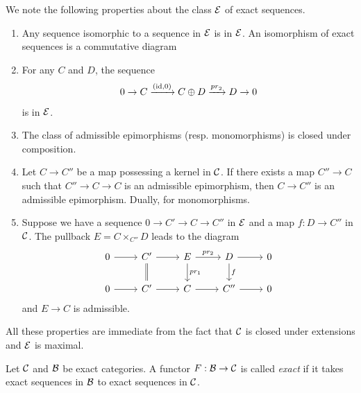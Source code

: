 \begin{proposition}
We note the following properties about the class $\mathcal{E}$ of exact sequences.
\begin{enumerate}
  \item Any sequence isomorphic to a sequence in $\mathcal{E}$ is in $\mathcal{E}$. An isomorphism of exact sequences is a commutative diagram
  \item For any $C$ and $D$, the sequence
  \[
  0 \to {C} \xrightarrow{(\operatorname*{id},0)} {C\oplus D} \xrightarrow{\mathord{pr}_2} {D} \to 0
  \]
  is in $\mathcal{E}$.
  \item The class of admissible epimorphisms (resp. monomorphisms) is closed under composition.
  \item Let $C \to C''$ be a map possessing a kernel in $\mathcal{C}$. If there exists a map $C'' \to C$
  such that $C'' \to C \to C$ is an admissible epimorphism, then $C \to C''$ is an admissible epimorphism.
  Dually, for monomorphisms.
  \item Suppose we have a sequence $0 \to C' \to C \to C''$ in $\mathcal{E}$ and a map $f : D \to C''$ in $\mathcal{C}$.
  The pullback $E = C \times_{C''} D$ leads to the diagram 
  \[
  \begin{tikzcd}
  0 \arrow[r] &   C' \arrow[r] \arrow[d, equal] &   E \arrow[r,  "\mathord{pr_2}"] \arrow[d, "\mathord{pr_1}"] &   D \arrow[r] \arrow[d, "f"] &   0  \\
  0 \arrow[r] &   C' \arrow[r]                &   C \arrow[r]                &   C'' \arrow[r]                &   0 
  \end{tikzcd}
  \] 
  and $E \to C$ is admissible. 
\end{enumerate}
\end{proposition}

All these properties are immediate from the fact that $\mathcal{C}$ is closed under extensions and $\mathcal{E}$ is maximal.

\begin{definition}
Let $\mathcal{C}$ and $\mathcal{B}$ be exact categories.
A functor $F : \mathcal{B} \to \mathcal{C}$ is called \emph{exact} if it takes
exact sequences in $\mathcal{B}$ to exact sequences in $\mathcal{C}$.
\end{definition}

